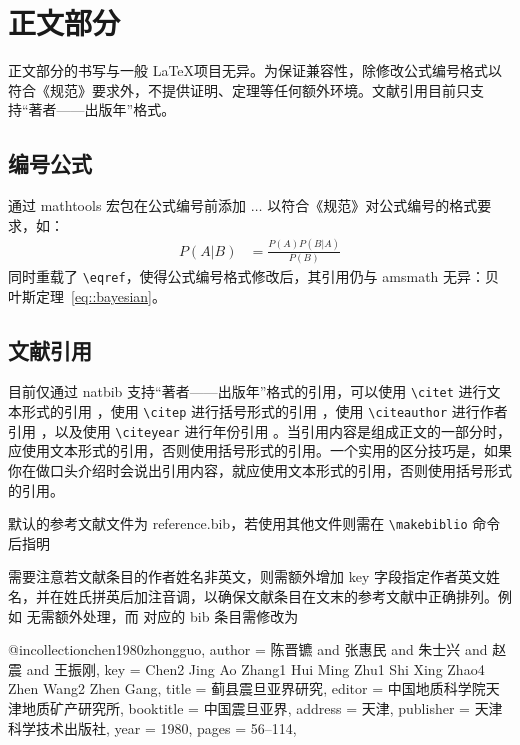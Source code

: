 \documentclass[bachelor, comfort]{shtthesis}
\begin{document}
\section{正文部分}
\shtthesis 正文部分的书写与一般 \LaTeX 项目无异。为保证兼容性，\shtthesis 除修改公式编号格式以符合《规范》要求外，不提供证明、定理等任何额外环境。文献引用目前只支持“著者——出版年”格式。

\subsection{编号公式}
\shtthesis 通过 \textsf{mathtools} 宏包在公式编号前添加 $\ldots$ 以符合《规范》对公式编号的格式要求，如：
\begin{align}
P(A|B) &= \frac{P(A)P(B|A)}{P(B)} \label{eq::bayesian}
\end{align}
同时重载了 \verb|\eqref|，使得公式编号格式修改后，其引用仍与 \textsf{amsmath} 无异：贝叶斯定理~\eqref{eq::bayesian}。

\subsection{文献引用} \label{sec::citation}
\shtthesis 目前仅通过 \textsf{natbib} 支持“著者——出版年”格式的引用，可以使用 \verb|\citet| 进行文本形式的引用 \citet{Bohan1928}，使用 \verb|\citep| 进行括号形式的引用 \citep{yuan2012lanc}，使用 \verb|\citeauthor| 进行作者引用 \citeauthor{niu2013zonghe}，以及使用 \verb|\citeyear| 进行年份引用 \citeyear{walls2013drought}。当引用内容是组成正文的一部分时，应使用文本形式的引用，否则使用括号形式的引用。一个实用的区分技巧是，如果你在做口头介绍时会说出引用内容，就应使用文本形式的引用，否则使用括号形式的引用。

\shtthesis 默认的参考文献文件为 reference.bib，若使用其他文件则需在 \verb|\makebiblio| 命令后指明
\begin{latex}
\makebiblio[mybiblio] %
\end{latex}
需要注意若文献条目的作者姓名非英文，则需额外增加 key 字段指定作者英文姓名，并在姓氏拼英后加注音调，以确保文献条目在文末的参考文献中正确排列。例如 \citet{bravo1990comparative} 无需额外处理，而 \citet{chen1980zhongguo} 对应的 bib 条目需修改为
\begin{latex}
@incollection{chen1980zhongguo,
  author    = {陈晋镳 and 张惠民 and 朱士兴 and 赵震 and 王振刚},
  key       = {Chen2 Jing Ao Zhang1 Hui Ming Zhu1 Shi Xing Zhao4 Zhen Wang2 Zhen Gang},
  title     = {蓟县震旦亚界研究},
  editor    = {中国地质科学院天津地质矿产研究所},
  booktitle = {中国震旦亚界},
  address   = {天津},
  publisher = {天津科学技术出版社},
  year      = {1980},
  pages     = {56--114},
}
\end{latex}
\end{document}
